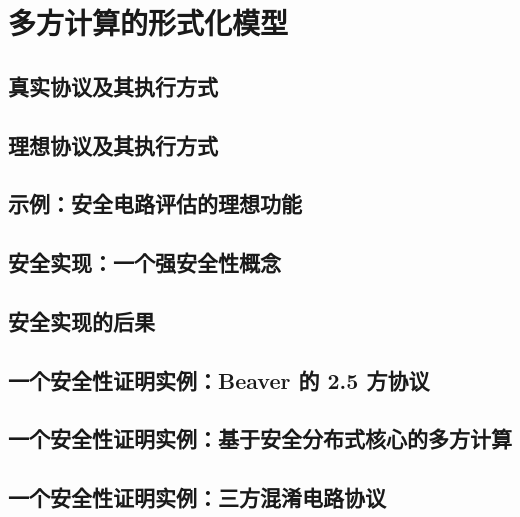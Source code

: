 \section{多方计算的形式化模型}\label{sec:22-5}

\subsection{真实协议及其执行方式}\label{subsec:22-5-1}

\subsection{理想协议及其执行方式}\label{subsec:22-5-2}

\subsection{示例：安全电路评估的理想功能}\label{subsec:22-5-3}

\subsection{安全实现：一个强安全性概念}\label{subsec:22-5-4}

\subsection{安全实现的后果}\label{subsec:22-5-5}

\subsection{一个安全性证明实例：Beaver 的 2.5 方协议}\label{subsec:22-5-6}

\subsection{一个安全性证明实例：基于安全分布式核心的多方计算}\label{subsec:22-5-7}

\subsection{一个安全性证明实例：三方混淆电路协议}\label{subsec:22-5-8}